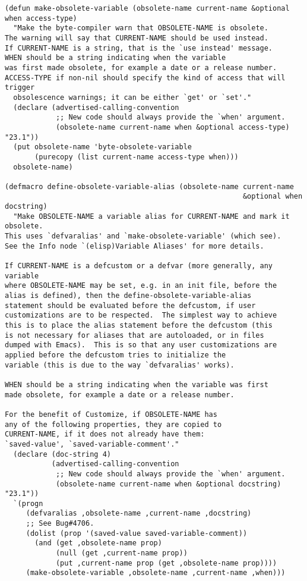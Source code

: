 \documentclass[8pt]{article}
\begin{document}
\begin{verbatim}
(defun make-obsolete-variable (obsolete-name current-name &optional when access-type)
  "Make the byte-compiler warn that OBSOLETE-NAME is obsolete.
The warning will say that CURRENT-NAME should be used instead.
If CURRENT-NAME is a string, that is the `use instead' message.
WHEN should be a string indicating when the variable
was first made obsolete, for example a date or a release number.
ACCESS-TYPE if non-nil should specify the kind of access that will trigger
  obsolescence warnings; it can be either `get' or `set'."
  (declare (advertised-calling-convention
            ;; New code should always provide the `when' argument.
            (obsolete-name current-name when &optional access-type) "23.1"))
  (put obsolete-name 'byte-obsolete-variable
       (purecopy (list current-name access-type when)))
  obsolete-name)

(defmacro define-obsolete-variable-alias (obsolete-name current-name
                                                        &optional when docstring)
  "Make OBSOLETE-NAME a variable alias for CURRENT-NAME and mark it obsolete.
This uses `defvaralias' and `make-obsolete-variable' (which see).
See the Info node `(elisp)Variable Aliases' for more details.

If CURRENT-NAME is a defcustom or a defvar (more generally, any variable
where OBSOLETE-NAME may be set, e.g. in an init file, before the
alias is defined), then the define-obsolete-variable-alias
statement should be evaluated before the defcustom, if user
customizations are to be respected.  The simplest way to achieve
this is to place the alias statement before the defcustom (this
is not necessary for aliases that are autoloaded, or in files
dumped with Emacs).  This is so that any user customizations are
applied before the defcustom tries to initialize the
variable (this is due to the way `defvaralias' works).

WHEN should be a string indicating when the variable was first
made obsolete, for example a date or a release number.

For the benefit of Customize, if OBSOLETE-NAME has
any of the following properties, they are copied to
CURRENT-NAME, if it does not already have them:
`saved-value', `saved-variable-comment'."
  (declare (doc-string 4)
           (advertised-calling-convention
            ;; New code should always provide the `when' argument.
            (obsolete-name current-name when &optional docstring) "23.1"))
  `(progn
     (defvaralias ,obsolete-name ,current-name ,docstring)
     ;; See Bug#4706.
     (dolist (prop '(saved-value saved-variable-comment))
       (and (get ,obsolete-name prop)
            (null (get ,current-name prop))
            (put ,current-name prop (get ,obsolete-name prop))))
     (make-obsolete-variable ,obsolete-name ,current-name ,when)))
\end{verbatim}
\end{document}
